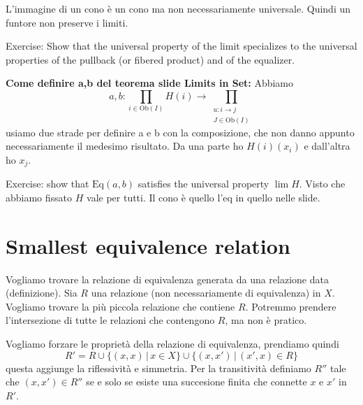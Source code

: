 \documentclass[a4paper]{article}
\begin{document}
L'immagine di un cono è un cono ma non necessariamente universale.
Quindi un funtore non preserve i limiti.

Exercise: Show that the universal property of the limit specializes
to the universal properties of the pullback (or fibered product) and of the equalizer.

\textbf{Come definire a,b del teorema slide Limits in Set:}
Abbiamo
\[
    a,b \colon \prod_{i \in \text{Ob}(I)} H(i)
    \to \prod_{\substack{u \colon i \to j \\ J \in \text{Ob}(I)}}
\]
usiamo due strade per definire a e b con la composizione, che non danno appunto necessariamente
il medesimo risultato. Da una parte ho \(H(i)(x_i)\) e dall'altra ho \(x_j\).

Exercise: show that \(\text{Eq}(a,b)\) satisfies
the universal property \(\lim H\).
Visto che abbiamo fissato \(H\) vale per tutti.
Il cono è quello l'eq in quello nelle slide.

\section{Smallest equivalence relation}

Vogliamo trovare la relazione di equivalenza
generata da una relazione data (definizione).
Sia \(R\) una relazione (non necessariamente di equivalenza) in \(X\).
Vogliamo trovare la più piccola relazione che contiene \(R\).
Potremmo prendere l'intersezione di tutte le relazioni che
contengono \(R\), ma non è pratico.

Vogliamo forzare le proprietà della relazione di equivalenza, prendiamo quindi
\[
    R' = R \cup \{(x,x) \,|\, x\in X\}
    \cup \{(x,x') \,|\, (x', x) \in R\}
\]
questa aggiunge la riflessività e simmetria.
Per la transitività definiamo
\(R''\) tale che \((x, x') \in R''\)
se e solo se esiste una succesione finita che connette \(x\) e \(x'\)
in \(R'\).
\end{document}
